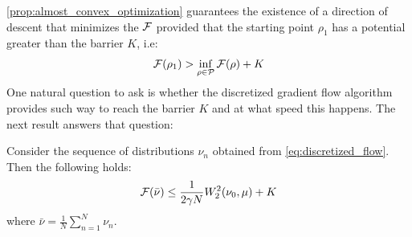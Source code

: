 \cref{prop:almost_convex_optimization} guarantees the existence of a direction of descent that minimizes the ${{\mathcal F}}$ provided that the starting point $\rho_1$ has a potential greater than the barrier $K$, i.e:
\begin{align}\label{eq:barrier_condition}
	{{\mathcal F}}(\rho_1)> \inf_{\rho\in \mathcal{P}} {{\mathcal F}}(\rho) + K
\end{align}
One natural question to ask is whether the  discretized gradient flow algorithm provides such way to reach the barrier $K$ and at what speed this happens. The next result answers that question:   

\begin{theorem}\label{th:rates_mmd}
	Consider the sequence of distributions $\nu_n$ obtained from \cref{eq:discretized_flow}. Then the following holds:
	\begin{align}
		{{\mathcal F}}(\bar{\nu})\leq \frac{1}{2\gamma N}W_2^2(\nu_0,\mu) +K
	\end{align}
	where $\bar{\nu}=\frac{1}{N}\sum_{n=1}^N \nu_n$.
\end{theorem}
